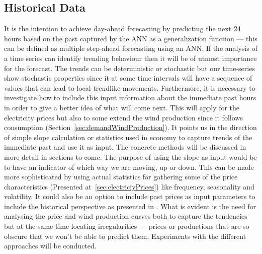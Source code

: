 \subsection{Historical Data}
\label{sec:historicalData}
It is the intention to achieve day-ahead forecasting by predicting the next 24 hours based on the past captured by the ANN as a generalization function  --- this can be defined as multiple step-ahead forecasting using an ANN\cite[Chapter~7.1.6]{econometrics}. 
If the analysis of a time series can identify trending behaviour then it will be of utmost importance for the forecast. The trends can be deterministic or stochastic but our time-series show stochastic properties since it at some time intervals will have a sequence of values that can lead to local trendlike movements\cite[Chapter~7.3]{econometrics}. Furthermore, it is necessary to investigate how to include this input information about the immediate past hours in order to give a better idea of what will come next. This will apply for the electricity prices but also to some extend the wind production since it follows consumption (Section~\ref{sec:demandWindProduction}). It points us in the direction of simple slope calculation or statistics used in economy to capture trends of the immediate past and use it as input. The concrete methods will be discussed in more detail in sections to come. The purpose of using the slope as input would be to have an indicator of which way we are moving, up or down. This can be made more sophisticated by using actual statistics for gathering some of the price characteristics (Presented at~\ref{sec:electriciyPrices}) like frequency, seasonality and volatility. It could also be an option to include past prices as input parameters to include the historical perspective as presented in \cite{singhal2011electricity}.
What is evident is the need for analysing the price and wind production curves both to capture the tendencies but at the same time locating irregularities --- prices or productions that are so obscure that we won't be able to predict them. Experiments with the different approaches will be conducted.
